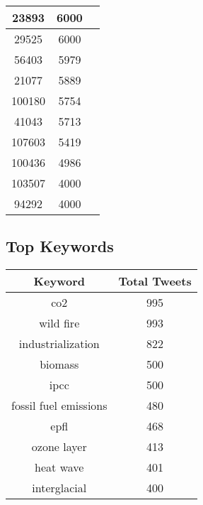 \documentclass{article}\usepackage[T1]{fontenc}
\begin{document}
\begin{tabular}{|c|c|c|}
 \hline
23893 & 6000\\ 
 \hline
29525 & 6000\\ 
 \hline
56403 & 5979\\ 
 \hline
21077 & 5889\\ 
 \hline
100180 & 5754\\ 
 \hline
41043 & 5713\\ 
 \hline
107603 & 5419\\ 
 \hline
100436 & 4986\\ 
 \hline
103507 & 4000\\ 
 \hline
94292 & 4000\\ 
 \hline
\end{tabular}\subsection*{Top Keywords}\begin{tabular}{|c|c|}         \hline         Keyword & Total Tweets \\ 
 \hline
co2 & 995\\ 
 \hline
wild fire & 993\\ 
 \hline
industrialization & 822\\ 
 \hline
biomass & 500\\ 
 \hline
ipcc & 500\\ 
 \hline
fossil fuel emissions & 480\\ 
 \hline
epfl & 468\\ 
 \hline
ozone layer & 413\\ 
 \hline
heat wave & 401\\ 
 \hline
interglacial & 400\\ 
 \hline
\end{tabular}
\end{document}
